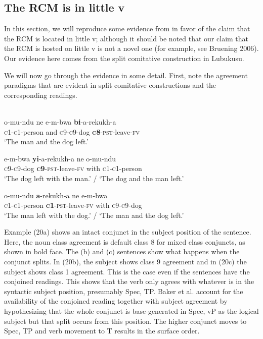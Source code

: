 \documentclass[output=paper]{langsci/langscibook}
\begin{document}
 
\subsection{ The RCM is in little v}


In this section, we will reproduce some evidence from \citet{BakerEtAl2013} in favor of the claim that the RCM is located in little v; although it should be noted that our claim that the RCM is hosted on little v is not a novel one (for example, see Bruening 2006). Our evidence here comes from the split comitative construction in Lubukusu. 

  We will now go through the evidence in some detail. First, note the agreement paradigms that are evident in split comitative constructions and the corresponding readings. 



\ea\label{ex:}
\\
\ea
\gll   o-mu-ndu        ne   e-m-bwa  \textbf{{bi}}{-a-rekukh-a} \\
       \textsc{c1-c1}-person   and  \textsc{c9-c9}-dog   \textbf{\textsc{c}}\textbf{8}-\textsc{pst}-leave-\textsc{fv} \\
\glt   ‘The man and the dog left.’

\ex
\gll   e-m-bwa  \textbf{{yi}}-a-rekukh-a     ne   o-mu-ndu\\
       \textsc{c9-c9}-dog  \textbf{\textsc{c}}\textbf{9}-\textsc{pst}-leave-\textsc{fv}   with   \textsc{c1-c1}-person\\
\glt   ‘The dog left with the man.’ / ‘The dog and the man left.’

\ex
\gll   o-mu-ndu   \textbf{a}-rekukh-a     ne   e-m-bwa\\
       \textsc{c1-c1}-person   \textbf{\textsc{c}}\textbf{1}-\textsc{pst}-leave-\textsc{fv}   with   \textsc{c9-c9}-dog\\
\glt   ‘The man left with the dog.’ / ‘The man and the dog left.’
\z
\z

Example (20a) shows an intact conjunct in the subject position of the sentence. Here, the noun class agreement is default class 8 for mixed class conjuncts, as shown in bold face. The (b) and (c) sentences show what happens when the conjunct splits. In (20b), the subject shows class 9 agreement and in (20c) the subject shows class 1 agreement. This is the case even if the sentences have the conjoined readings. This shows that the verb only agrees with whatever is in the syntactic subject position, presumably Spec, TP. Baker et al. account for the availability of the conjoined reading together with subject agreement by hypothesizing that the whole conjunct is base-generated in Spec, vP as the logical subject but that split occurs from this position. The higher conjunct moves to Spec, TP and verb movement to T results in the surface order.  
\end{document}
